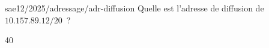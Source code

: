 \begin{question}{sae12/2025/adressage/adr-diffusion}
  Quelle est l'adresse de diffusion de $10.157.89.12/20$~?
  \begin{reponses}{4}{0}
  \end{reponses}
\end{question}
